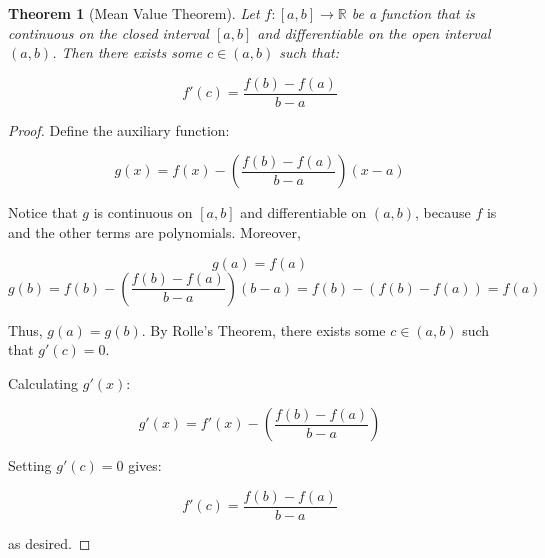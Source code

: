 \documentclass{article}
\newtheorem{theorem}{Theorem}
\begin{document}
\begin{theorem}[Mean Value Theorem]
Let \( f : [a, b] \to \mathbb{R} \) be a function that is continuous on the closed interval \([a, b]\) and differentiable on the open interval \((a, b)\). Then there exists some \( c \in (a, b) \) such that:

\[
f'(c) = \frac{f(b) - f(a)}{b - a}
\]
\end{theorem}

\begin{proof}
Define the auxiliary function:

\[
g(x) = f(x) - \left( \frac{f(b) - f(a)}{b - a} \right)(x - a)
\]

Notice that \( g \) is continuous on \([a, b]\) and differentiable on \((a, b)\), because \( f \) is and the other terms are polynomials. Moreover,

\[
g(a) = f(a)
\]
\[
g(b) = f(b) - \left( \frac{f(b) - f(a)}{b - a} \right)(b - a) = f(b) - (f(b) - f(a)) = f(a)
\]

Thus, \( g(a) = g(b) \). By Rolle's Theorem, there exists some \( c \in (a, b) \) such that \( g'(c) = 0 \).

Calculating \( g'(x) \):

\[
g'(x) = f'(x) - \left( \frac{f(b) - f(a)}{b - a} \right)
\]

Setting \( g'(c) = 0 \) gives:

\[
f'(c) = \frac{f(b) - f(a)}{b - a}
\]

as desired. \qedhere
\end{proof}
\end{document}
